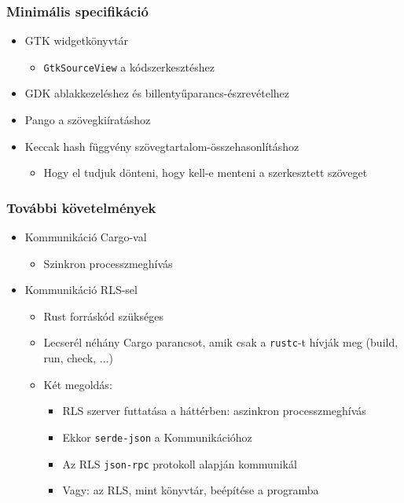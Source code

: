 \documentclass{beamer}
\begin{document}
    \begin{frame}[fragile]
        \frametitle{Minimális specifikáció}

        \begin{itemize}
            \item GTK widgetkönyvtár \begin{itemize}
                \item \texttt{GtkSourceView} a kódszerkesztéshez
            \end{itemize}
            \item GDK ablakkezeléshez és billentyűparancs-észrevételhez
            \item Pango a szövegkiíratáshoz
            \item Keccak hash függvény szövegtartalom-összehasonlításhoz \begin{itemize}
                \item Hogy el tudjuk dönteni, hogy kell-e menteni a szerkesztett szöveget
            \end{itemize}
        \end{itemize}
    \end{frame}

    \begin{frame}[fragile]
        \frametitle{További követelmények}

        \begin{itemize}
            \item Kommunikáció Cargo-val \begin{itemize}
                \item Szinkron processzmeghívás
            \end{itemize}
            \item Kommunikáció RLS-sel \begin{itemize}
                \item Rust forráskód szükséges
                \item Lecserél néhány Cargo parancsot, amik csak a \texttt{rustc}-t hívják meg (build, run, check, ...)
                \item Két megoldás: \begin{itemize}
                    \item RLS szerver futtatása a háttérben: aszinkron processzmeghívás
                    \item Ekkor \texttt{serde-json} a Kommunikációhoz
                    \item Az RLS \texttt{json-rpc} protokoll alapján kommunikál
                    \item Vagy: az RLS, mint könyvtár, beépítése a programba
                \end{itemize}
            \end{itemize}
        \end{itemize}
    \end{frame}
\end{document}
